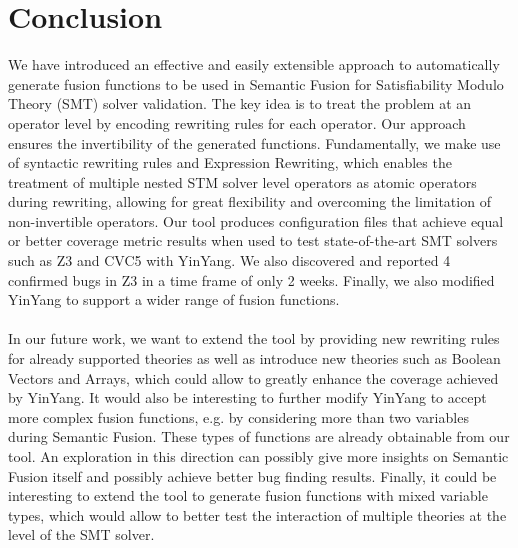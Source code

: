 \documentclass[sigplan,screen]{acmart}
\begin{document}
\section{Conclusion}
We have introduced an effective and easily extensible approach to automatically generate fusion functions to be used in Semantic Fusion for Satisfiability Modulo Theory (SMT) solver validation. The key idea is to treat the problem at an operator level by encoding rewriting rules for each operator. Our approach ensures the invertibility of the generated functions. Fundamentally, we make use of syntactic rewriting rules and Expression Rewriting, which enables the treatment of multiple nested STM solver level operators as atomic operators during rewriting, allowing for great flexibility and overcoming the limitation of non-invertible operators. Our tool produces configuration files that achieve equal or better coverage metric results when used to test state-of-the-art SMT solvers such as Z3 and CVC5 with YinYang. We also discovered and reported 4 confirmed bugs in Z3 in a time frame of only 2 weeks. Finally, we also modified YinYang to support a wider range of fusion functions.
\\ \\
In our future work, we want to extend the tool by providing new rewriting rules for already supported theories as well as introduce new theories such as Boolean Vectors and Arrays, which could allow to greatly enhance the coverage achieved by YinYang. It would also be interesting to further modify YinYang to accept more complex fusion functions, e.g. by considering more than two variables during Semantic Fusion. These types of functions are already obtainable from our tool. An exploration in this direction can possibly give more insights on Semantic Fusion itself and possibly achieve better bug finding results. Finally, it could be interesting to extend the tool to generate fusion functions with mixed variable types, which would allow to better test the interaction of multiple theories at the level of the SMT solver.



\end{document}

